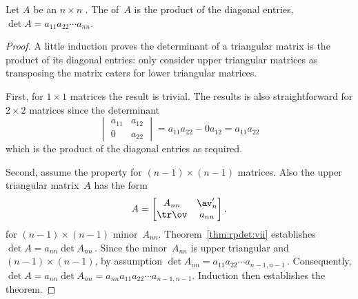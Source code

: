 \begin{theorem}\label{thm:rpdet:vi} 
Let \(A\) be an \(n\times n\) .
The  of~\(A\) is the product of the diagonal entries, \(\det A=a_{11}a_{22}\cdots a_{nn}\).
\end{theorem}
\begin{proof} 
A little induction proves the determinant of a triangular matrix is the product of its diagonal entries: only consider upper triangular matrices as transposing the matrix caters for lower triangular matrices.

First, for \(1\times 1\) matrices the result is trivial.
The results is also straightforward for \(2\times 2\) matrices since the determinant
\begin{equation*}
\begin{vmatrix} a_{11}&a_{12}\\0&a_{22} \end{vmatrix}
=a_{11}a_{22}-0a_{12}=a_{11}a_{22}
\end{equation*}
which is the product of the diagonal entries as required.

Second, assume the property for \((n-1)\times(n-1)\) matrices.
Also the upper triangular matrix~\(A\) has the form
\begin{equation*}
A=\begin{bmatrix} A_{nn}&\av_n'\\\tr\ov&a_{nn} \end{bmatrix}.
\end{equation*}
for \((n-1)\times(n-1)\) minor~\(A_{nn}\).
Theorem~\ref{thm:rpdet:vii} establishes \(\det A=a_{nn}\det A_{nn}\)\,.  
Since the  minor~\(A_{nn}\) is upper triangular and \((n-1)\times(n-1)\), by assumption \(\det A_{nn}=a_{11}a_{22}\cdots a_{n-1,n-1}\)\,.
Consequently, \(\det A=a_{nn}\det A_{nn}=a_{nn}a_{11}a_{22}\cdots a_{n-1,n-1}\).
Induction then establishes the theorem.
\end{proof}




